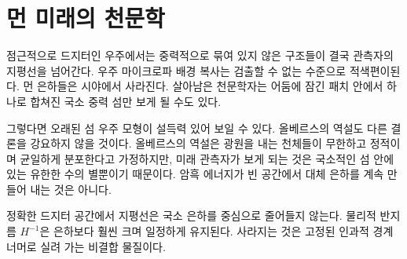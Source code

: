 \section{먼 미래의 천문학}

점근적으로 드지터인 우주에서는 중력적으로 묶여 있지 않은 구조들이 결국 관측자의 지평선을 넘어간다. 우주 마이크로파 배경 복사는 검출할 수 없는 수준으로 적색편이된다. 먼 은하들은 시야에서 사라진다. 살아남은 천문학자는 어둠에 잠긴 패치 안에서 하나로 합쳐진 국소 중력 섬만 보게 될 수도 있다.

\begin{classroomqa}
\end{classroomqa}

그렇다면 오래된 섬 우주 모형이 설득력 있어 보일 수 있다. 올베르스의 역설도 다른 결론을 강요하지 않을 것이다. 올베르스의 역설은 광원을 내는 천체들이 무한하고 정적이며 균일하게 분포한다고 가정하지만, 미래 관측자가 보게 되는 것은 국소적인 섬 안에 있는 유한한 수의 별뿐이기 때문이다. 암흑 에너지가 빈 공간에서 대체 은하를 계속 만들어 내는 것은 아니다.

정확한 드지터 공간에서 지평선은 국소 은하를 중심으로 줄어들지 않는다. 물리적 반지름 \(H^{-1}\)은 은하보다 훨씬 크며 일정하게 유지된다. 사라지는 것은 고정된 인과적 경계 너머로 실려 가는 비결합 물질이다.

\begin{classroomqa}
\end{classroomqa}

\begin{classroomqa}
\end{classroomqa}


